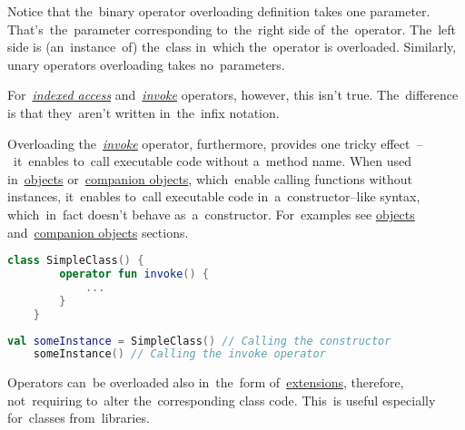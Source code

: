 \noindent Notice that the~binary operator overloading definition takes one parameter.
That's~the~parameter corresponding to~the~right side of~the~operator.
The~left side is (an~instance~of) the~class in~which the~operator is overloaded.
Similarly, unary operators overloading takes no~parameters.

For~\hyperref[kotlinindexedaccess]{\textit{indexed access}} \mbox{and \hyperref[kotlininvoke]{\textit{invoke}}} operators, however, this isn't true.
The~difference is that they~aren't written in~the~infix notation.

\label{kotlininvokeoverload}
Overloading the~\hyperref[kotlininvoke]{\textit{invoke}} operator, furthermore, provides one tricky effect~--~it~enables to~call executable code without a~method name.
When used in~\hyperref[kotlinobject]{objects} or~\hyperref[kotlincompanionobject]{companion objects}, which~enable calling functions without instances, it~enables to~call executable code in~a~constructor--like syntax, which~in~fact doesn't behave as~a~constructor.
For~examples see \hyperref[kotlinobject]{objects} and~\hyperref[kotlincompanionobject]{companion objects} sections.
\newpage

\begin{lstlisting}[language=Kotlin, title={Custom class with \textit{invoke} operator overloading}]
    class SimpleClass() {
        operator fun invoke() {
            ...
        }
    }
\end{lstlisting}
\begin{lstlisting}[language=Kotlin, title={Usage -- no conflict with constructor}]
    val someInstance = SimpleClass() // Calling the constructor
    someInstance() // Calling the invoke operator
\end{lstlisting}

\note Operators can~be overloaded also in~the~form of~\hyperref[kotlinextension]{extensions}, therefore, not~requiring to~alter the~corresponding class code.
This~is useful especially for~classes from~libraries.
